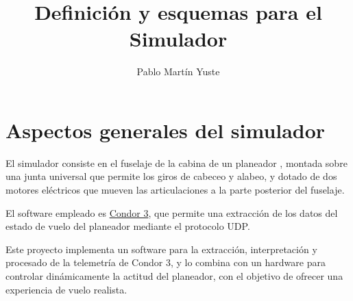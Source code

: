 \documentclass[10pt, oneside]{trabajo}
\title{Definición y esquemas para el Simulador}
\author{Pablo Martín Yuste}
\begin{document}
\maketitle

\section{Aspectos generales del simulador}
El simulador consiste en el fuselaje de la cabina de un planeador , montada sobre una junta universal que permite los giros de cabeceo y alabeo, y dotado de dos motores eléctricos que mueven las articulaciones a la parte posterior del fuselaje.
\par El software empleado es \href{https://www.condorsoaring.com/}{Condor 3}, que permite una extracción de los datos del estado de vuelo del planeador mediante el protocolo UDP.
\par Este proyecto implementa un software para la extracción, interpretación y procesado de la telemetría de Condor 3, y lo combina con un hardware para controlar dinámicamente la actitud del planeador, con el objetivo de ofrecer una experiencia de vuelo realista.
\end{document}
